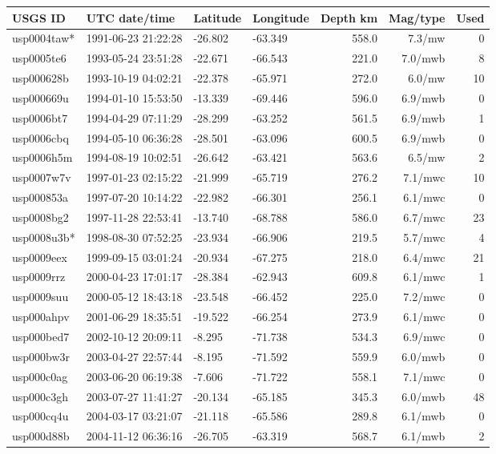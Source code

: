 \documentclass[10pt]{article}
\begin{document}
\begin{longtable}{llllrrr}
\toprule USGS ID & UTC date/time & Latitude & Longitude & Depth km & Mag/type & Used\\\midrule\endhead
usp0004taw* & 1991-06-23 21:22:28 & -26.802 & -63.349 & 558.0 & 7.3/mw & 0 \\
usp0005te6 & 1993-05-24 23:51:28 & -22.671 & -66.543 & 221.0 & 7.0/mwb & 8 \\
usp000628b & 1993-10-19 04:02:21 & -22.378 & -65.971 & 272.0 & 6.0/mw & 10 \\
usp000669u & 1994-01-10 15:53:50 & -13.339 & -69.446 & 596.0 & 6.9/mwb & 0 \\
usp0006bt7 & 1994-04-29 07:11:29 & -28.299 & -63.252 & 561.5 & 6.9/mwb & 1 \\
usp0006cbq & 1994-05-10 06:36:28 & -28.501 & -63.096 & 600.5 & 6.9/mwb & 0 \\
usp0006h5m & 1994-08-19 10:02:51 & -26.642 & -63.421 & 563.6 & 6.5/mw & 2 \\
usp0007w7v & 1997-01-23 02:15:22 & -21.999 & -65.719 & 276.2 & 7.1/mwc & 10 \\
usp000853a & 1997-07-20 10:14:22 & -22.982 & -66.301 & 256.1 & 6.1/mwc & 0 \\
usp0008bg2 & 1997-11-28 22:53:41 & -13.740 & -68.788 & 586.0 & 6.7/mwc & 23 \\
usp0008u3b* & 1998-08-30 07:52:25 & -23.934 & -66.906 & 219.5 & 5.7/mwc & 4 \\
usp0009eex & 1999-09-15 03:01:24 & -20.934 & -67.275 & 218.0 & 6.4/mwc & 21 \\
usp0009rrz & 2000-04-23 17:01:17 & -28.384 & -62.943 & 609.8 & 6.1/mwc & 1 \\
usp0009suu & 2000-05-12 18:43:18 & -23.548 & -66.452 & 225.0 & 7.2/mwc & 0 \\
usp000ahpv & 2001-06-29 18:35:51 & -19.522 & -66.254 & 273.9 & 6.1/mwc & 0 \\
usp000bed7 & 2002-10-12 20:09:11 & -8.295 & -71.738 & 534.3 & 6.9/mwc & 0 \\
usp000bw3r & 2003-04-27 22:57:44 & -8.195 & -71.592 & 559.9 & 6.0/mwb & 0 \\
usp000c0ag & 2003-06-20 06:19:38 & -7.606 & -71.722 & 558.1 & 7.1/mwc & 0 \\
usp000c3gh & 2003-07-27 11:41:27 & -20.134 & -65.185 & 345.3 & 6.0/mwb & 48 \\
usp000cq4u & 2004-03-17 03:21:07 & -21.118 & -65.586 & 289.8 & 6.1/mwb & 0 \\
usp000d88b & 2004-11-12 06:36:16 & -26.705 & -63.319 & 568.7 & 6.1/mwb & 2 \\

\end{longtable}
\end{document}
